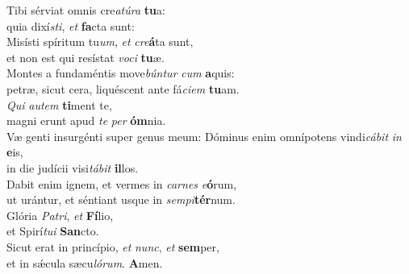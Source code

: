 \oddverse Tibi sérviat omnis cre\textit{a}\textit{tú}\textit{ra} \textbf{tu}a:~\*\\
\oddverse quia dixí\textit{sti}, \textit{et} \textbf{fa}cta sunt:\\
\evenverse Misísti spíritum tu\textit{um}, \textit{et} \textit{cre}\textbf{á}ta sunt,~\*\\
\evenverse et non est qui resístat \textit{vo}\textit{ci} \textbf{tu}æ.\\
\oddverse Montes a fundaméntis move\textit{bún}\textit{tur} \textit{cum} \textbf{a}quis:~\*\\
\oddverse petræ, sicut cera, liquéscent ante fá\textit{ci}\textit{em} \textbf{tu}am.\\
\evenverse \textit{Qui} \textit{au}\textit{tem} \textbf{ti}ment te,~\*\\
\evenverse magni erunt apud \textit{te} \textit{per} \textbf{óm}nia.\\
\oddverse Væ genti insurgénti super genus meum: Dóminus enim omnípotens vindi\textit{cá}\textit{bit} \textit{in} \textbf{e}is,~\*\\
\oddverse in die judícii visi\textit{tá}\textit{bit} \textbf{il}los.\\
\evenverse Dabit enim ignem, et vermes in \textit{car}\textit{nes} \textit{e}\textbf{ó}rum,~\*\\
\evenverse ut urántur, et séntiant usque in \textit{sem}\textit{pi}\textbf{tér}num.\\
\oddverse Glória \textit{Pa}\textit{tri}, \textit{et} \textbf{Fí}lio,~\*\\
\oddverse et Spirí\textit{tu}\textit{i} \textbf{San}cto.\\
\evenverse Sicut erat in princípio, \textit{et} \textit{nunc}, \textit{et} \textbf{sem}per,~\*\\
\evenverse et in sǽcula sæcu\textit{ló}\textit{rum}. \textbf{A}men.\\
